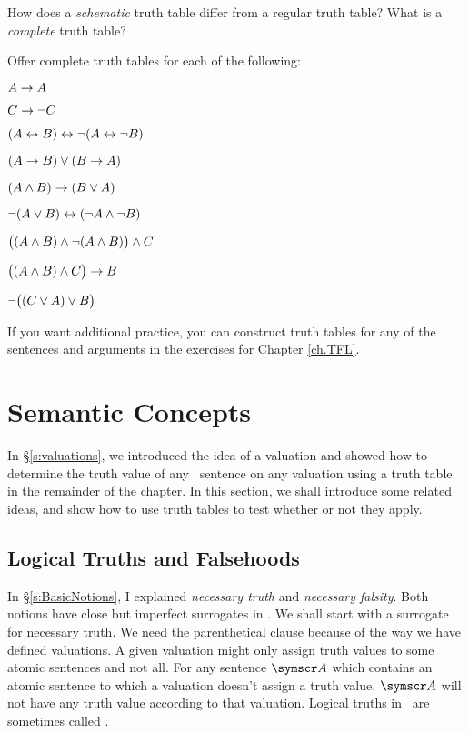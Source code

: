 \label{pr.TT.TTorC.p}\practiceproblems
\problempart
How does a \emph{schematic} truth table differ from a regular truth table? What is a \emph{complete} truth table?

\problempart\label{pr.TT.TTorC}
Offer complete truth tables for each of the following: 
\begin{earg}
\item $A \rightarrow A$ %
\item $C \rightarrow\neg C$ %
\item $(A \leftrightarrow B) \leftrightarrow \neg(A\leftrightarrow \neg B)$ %
\item $(A \rightarrow B) \vee (B \rightarrow A)$ %
\item $(A \wedge B) \rightarrow (B \vee A)$  %
\item $\neg(A \vee B) \leftrightarrow (\neg A \wedge \neg B)$ %
\item $\bigl( (A\wedge B) \wedge\neg(A\wedge B) \bigr) \wedge C$ %
\item $\bigl( (A \wedge B) \wedge C\bigr) \rightarrow B$ %
\item $\neg\bigl( (C\vee A) \vee B\bigr)$ %
\end{earg}

If you want additional practice, you can construct truth tables for any of the sentences and arguments in the exercises for Chapter \ref{ch.TFL}.


\chapter{Semantic Concepts}\label{s:Semantic.concepts}
In §\ref{s:valuations}, we introduced the idea of a valuation and showed how to determine the truth value of any \TFL\ sentence on any valuation using a truth table in the remainder of the chapter. In this section, we shall introduce some related ideas, and show how to use truth tables to test whether or not they apply.


\section{Logical Truths and Falsehoods}
In §\ref{s:BasicNotions}, I explained \emph{necessary truth} and \emph{necessary falsity}. Both notions have close but imperfect surrogates in \TFL. We shall start with a surrogate for necessary truth.
We need the parenthetical clause because of the way we have defined valuations. A given valuation might only assign truth values to some atomic sentences and not all. For any sentence $\meta{A}$ which contains an atomic sentence to which a valuation doesn't assign a truth value, $\meta{A}$ will not have any truth value according to that valuation. Logical truths in \TFL\ are sometimes called .

